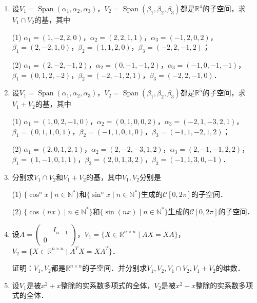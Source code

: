 \documentclass[a4paper,fontset=windows]{ctexbook}
\theoremstyle{definition}
\DeclareMathOperator{\Span}{Span}
\begin{document}
\begin{enumerate}
\item 设$V_1=\Span(\alpha_1,\alpha_2,\alpha_3)$，$V_2=\Span(\beta_1,\beta_2,\beta_3)$都是$\mathbb{R}^4$的子空间，求$V_1\cap V_2$的基，其中

(1) $\alpha_1=(1,-2,2,0)$，$\alpha_2=(2,2,1,1)$，$\alpha_3=(-1,2,0,2)$，\\ \hspace*{18pt}$\beta_1=(2,-2,1,0)$，$\beta_2=(1,1,2,0)$，$\beta_3=(-2,2,-1,2)$；

(2) $\alpha_1=(2,-2,-1,2)$，$\alpha_2=(0,-1,-1,2)$，$\alpha_3=(-1,0,-1,-1)$，\\ \hspace*{18pt}$\beta_1=(0,1,2,-2)$，$\beta_2=(-2,-1,2,1)$，$\beta_3=(-2,2,-1,0)$．

\item 设$V_1=\Span(\alpha_1,\alpha_2,\alpha_3)$，$V_2=\Span(\beta_1,\beta_2,\beta_3)$都是$\mathbb{R}^5$的子空间，求$V_1+V_2$的基，其中

(1) $\alpha_1=(1,0,2,-1,0)$，$\alpha_2=(0,1,0,0,2)$，$\alpha_3=(-2,1,-3,2,1)$，\\ \hspace*{18pt}$\beta_1=(0,1,1,0,1)$，$\beta_2=(-1,1,0,1,0)$，$\beta_3=(-1,1,-2,1,2)$；

(2) $\alpha_1=(2,0,1,2,1)$，$\alpha_2=(2,-2,-3,1,2)$，$\alpha_3=(2,-1,-1,2,2)$，\\ \hspace*{18pt}$\beta_1=(1,-1,0,1,1)$，$\beta_2=(2,0,1,3,2)$，$\beta_3=(-1,1,3,0,-1)$．

\item 分别求$V_1\cap V_2$和$V_1+V_2$的基，其中$V_1,V_2$分别是

(1) $\{\cos^nx\mid n\in\mathbb{N}^*\}$和$\{\sin^nx\mid n\in\mathbb{N}^*\}$生成的$\mathscr{C}[0,2\pi]$的子空间．

(2) $\{\cos(nx)\mid n\in\mathbb{N}^*\}$和$\{\sin(nx)\mid n\in\mathbb{N}^*\}$生成的$\mathscr{C}[0,2\pi]$的子空间．

\item 设$A=\begin{pmatrix}&I_{n-1} \\ 0&\end{pmatrix}$，$V_1=\{X\in\mathbb{R}^{n\times n}\mid AX=XA\}$，$V_2=\{X\in\mathbb{R}^{n\times n}\mid A^TX=XA^T\}$．

证明：$V_1,V_2$都是$\mathbb{R}^{n\times n}$的子空间．并分别求$V_1,V_2,V_1\cap V_2,V_1+V_2$的维数．

\item 设$V_1$是被$x^2+x$整除的实系数多项式的全体，$V_2$是被$x^2-x$整除的实系数多项式的全体．


\end{enumerate}
\end{document}
